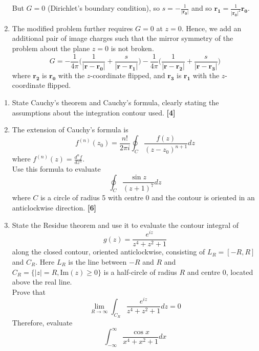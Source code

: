\documentclass[a4paper]{article}
\begin{document}
\begin{ans}
\begin{enumerate}[label=(\alph*)]
But $G=0$ (Dirichlet's boundary condition), so $s=-\frac{1}{|\mathbf{r_0}|}$ and so $\mathbf{r_1}=\frac{1}{|\mathbf{r_0}|^2}\mathbf{r_0}$.
\item The modified problem further requires $G=0$ at $z=0$. Hence, we add an additional pair of image charges such that the mirror symmetry of the problem about the plane $z=0$ is not broken.
$$G=-\frac{1}{4\pi}\bigg(\frac{1}{|\mathbf{r}-\mathbf{r_0}|}+\frac{s}{|\mathbf{r}-\mathbf{r_1}|}\bigg)-\frac{1}{4\pi}\bigg(\frac{1}{|\mathbf{r}-\mathbf{r_2}|}+\frac{s}{|\mathbf{r}-\mathbf{r_3}|}\bigg)$$
where $\mathbf{r_2}$ is $\mathbf{r_0}$ with the $z$-coordinate flipped, and $\mathbf{r_3}$ is $\mathbf{r_1}$ with the $z$-coordinate flipped.
\end{enumerate}
\end{ans}
\newpage
\begin{qns}\leavevmode
\begin{enumerate}[label=(\alph*)]
\item State Cauchy’s theorem and Cauchy’s formula, clearly stating the assumptions about the integration contour used. \hfill\textbf{[4]}
\item The extension of Cauchy’s formula is
$$f^{(n)}(z_0)=\frac{n!}{2\pi i}\oint_C\frac{f(z)}{(z-z_0)^{n+1}}dz$$
where $f^{(n)}(z) = \frac{d^nf}{dz^n}$.\\[5pt]
Use this formula to evaluate
$$\oint_C\frac{\sin z}{(z+1)^7}dz$$
where $C$ is a circle of radius 5 with centre 0 and the contour is oriented in an anticlockwise direction. \hfill\textbf{[6]}
\item State the Residue theorem and use it to evaluate the contour integral of
$$g(z)=\frac{e^{iz}}{z^4+z^2+1}$$
along the closed contour, oriented anticlockwise, consisting of $L_R = [−R,R]$ and $C_R$. Here $L_R$ is the line between $−R$ and $R$ and $C_R = \{|z| = R, \text{Im}(z)\geq 0\}$ is a half-circle of radius $R$ and centre 0, located above the real line.\\[5pt]
Prove that
$$\lim_{R\rightarrow\infty}\int_{C_R}\frac{e^{iz}}{z^4+z^2+1}dz=0$$
Therefore, evaluate 
$$\int_{-\infty}^\infty\frac{\cos x}{x^4+x^2+1}dx$$
\end{enumerate}
\end{qns}
\end{document}
